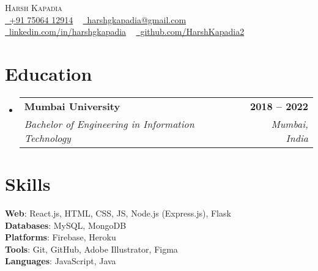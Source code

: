 \documentclass[letterpaper,11pt]{article}
\makeatletter
\newcommand{\resumeSubheading}[4]{
  \vspace{-2pt}\item
    \begin{tabular*}{1.0\textwidth}[t]{l@{\extracolsep{\fill}}r}
      \textbf{#1} & \textbf{\small #2} \\
      \textit{\small#3} & \textit{\small #4} \\
    \end{tabular*}\vspace{-7pt}
}
\newcommand{\resumeSubHeadingListStart}{\begin{itemize}[leftmargin=0.0in, label={}]}
\newcommand{\resumeSubHeadingListEnd}{\end{itemize}}
\makeatother
\begin{document}

\begin{center}
    {\Huge \scshape Harsh Kapadia} \\ \vspace{2pt}
    \small
    \faPhone \href{tel:+917506412914}{\raisebox{-0.1\height}\ +91 75064 12914} ~
    \faEnvelope \href{mailto:harshgkapadia@gmail.com}{\raisebox{-0.2\height}\  harshgkapadia@gmail.com} ~
    \faLinkedin \href{https://linkedin.com/in/harshgkapadia}{\raisebox{-0.2\height}\ linkedin.com/in/harshgkapadia} ~
    \faGithub \href{https://github.com/HarshKapadia2}{\raisebox{-0.2\height}\ github.com/HarshKapadia2}
    \vspace{-8pt}
\end{center}


\section{Education}
  \resumeSubHeadingListStart
    \resumeSubheading
        {Mumbai University}{2018 -- 2022}
        {Bachelor of Engineering in Information Technology}{Mumbai, India}
    \resumeSubHeadingListEnd


\section{Skills}
    \begin{itemize}[leftmargin=0.2in, label={}]
    {\item{
        \textbf{Web}: React.js, HTML, CSS, JS, Node.js (Express.js), Flask \\
        \textbf{Databases}: MySQL, MongoDB \\
        \textbf{Platforms}: Firebase, Heroku \\
        \textbf{Tools}: Git, GitHub, Adobe Illustrator, Figma \\
        \textbf{Languages}: JavaScript, Java
    }}
    \end{itemize}
\vspace{-16pt}
\end{document}
